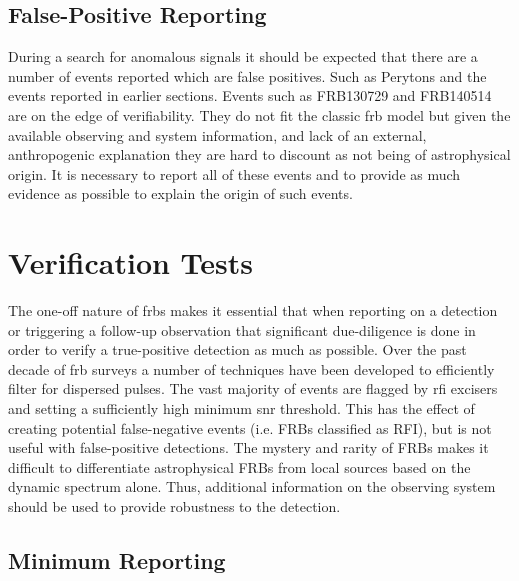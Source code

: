 \documentclass[a4paper,fleqn,usenatbib]{mnras}
\begin{document}
\subsection{False-Positive Reporting}

During a search for anomalous signals it should be expected that there are a
number of events reported which are false positives. Such as Perytons
\citep{2011ApJ...727...18B} and the events reported in earlier sections. Events
such as FRB130729 and FRB140514 are on the edge of verifiability. They do not
fit the classic \gls{frb} model but given the available observing and system
information, and lack of an external, anthropogenic explanation they are hard
to discount as not being of astrophysical origin. It is necessary to report
all of these events and to provide as much evidence as possible to explain the
origin of such events.

\section{Verification Tests}

The one-off nature of \glspl{frb} makes it essential that when reporting on a
detection or triggering a follow-up observation that significant due-diligence
is done in order to verify a true-positive detection as much as possible. Over the
past decade of \gls{frb} surveys a number of techniques have been developed to
efficiently filter for dispersed pulses. The vast majority of events are flagged
by \gls{rfi} excisers and setting a sufficiently high minimum \gls{snr}
threshold. This has the effect of creating potential false-negative events (i.e.
FRBs classified as RFI), but is not useful with false-positive detections. The
mystery and rarity of FRBs makes it difficult to differentiate astrophysical FRBs
from local sources based on the dynamic spectrum alone. Thus, additional
information on the observing system should be used to provide robustness to the
detection.


\subsection{Minimum Reporting}
\end{document}
